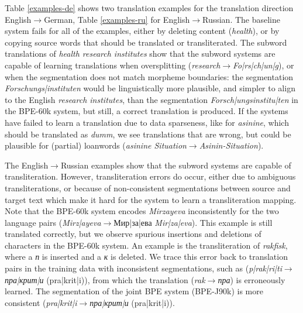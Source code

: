 \documentclass[11pt]{article}
\newcommand{\pipe}{{\color{gray}|}}
\begin{document}
Table \ref{examples-de} shows two translation examples for the translation direction English$\to$German,
Table \ref{examples-ru} for English$\to$Russian.
The baseline system fails for all of the examples, either by deleting content (\emph{health}), or by copying source words that should be translated or transliterated.
The subword translations of \emph{health research institutes} show that the subword systems are capable of learning translations when oversplitting (\emph{research}$\rightarrow$\emph{Fo\pipe rs\pipe ch\pipe un\pipe g}),
or when the segmentation does not match morpheme boundaries: the segmentation \emph{Forschungs\pipe instituten} would be linguistically more plausible, and simpler to align to the English \emph{research institutes},
than the segmentation \emph{Forsch\pipe ungsinstitu\pipe ten} in the BPE-60k system, but still, a correct translation is produced.
If the systems have failed to learn a translation due to data sparseness, like for \emph{asinine}, which should be translated as \emph{dumm}, we see translations that are wrong, but could be plausible for (partial) loanwords (\emph{asinine Situation}$\rightarrow$\emph{Asinin-Situation}).

The English$\to$Russian examples show that the subword systems are capable of transliteration.
However, transliteration errors do occur, either due to ambiguous transliterations, or because of non-consistent segmentations between source and target text which make it hard for the system to learn a transliteration mapping.
Note that the BPE-60k system encodes \emph{Mirzayeva} inconsistently for the two language pairs (\emph{Mirz\pipe ayeva}$\rightarrow$\foreignlanguage{russian}{Мир\pipe за\pipe ева} \emph{Mir\pipe za\pipe eva}).
This example is still translated correctly, but we observe spurious insertions and deletions of characters in the BPE-60k system.
An example is the transliteration of \emph{rakfisk}, where a \emph{\foreignlanguage{russian}{п}} is inserted and a \emph{\foreignlanguage{russian}{к}} is deleted.
We trace this error back to translation pairs in the training data with inconsistent segmentations, such as (\emph{p\pipe rak\pipe ri\pipe ti}$\rightarrow$\emph{\foreignlanguage{russian}{пра\pipe крит\pipe и}} (pra\pipe krit\pipe i)), from which the translation (\emph{rak}$\rightarrow$\emph{\foreignlanguage{russian}{пра}}) is erroneously learned.
The segmentation of the joint BPE system (BPE-J90k) is more consistent (\emph{pra\pipe krit\pipe i}$\rightarrow$\emph{\foreignlanguage{russian}{пра\pipe крит\pipe и}} (pra\pipe krit\pipe i)).
\end{document}
